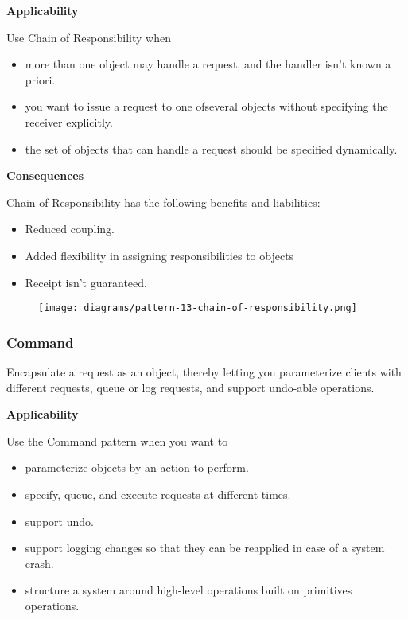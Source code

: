 \documentclass{article}
\begin{document}
\textbf{Applicability}

Use Chain of Responsibility when

\begin{itemize}
    \item more than one object may handle a request, and the handler isn't known a priori.
    \item you want to issue a request to one ofseveral objects without specifying the receiver explicitly.
    \item the set of objects that can handle a request should be specified dynamically.
\end{itemize}

\textbf{Consequences}

Chain of Responsibility has the following benefits and liabilities:
\begin{itemize}
    \item Reduced coupling.
    \item Added flexibility in assigning responsibilities to objects
    \item Receipt isn't guaranteed.
\end{itemize}

\begin{figure}[h]
    \centering
    \texttt{[image: diagrams/pattern-13-chain-of-responsibility.png]}
\end{figure}

\newpage
\subsubsection{Command}
Encapsulate a request as an object, thereby letting you parameterize clients with different requests, queue or log requests, and support undo-able
operations.

\textbf{Applicability}

Use the Command pattern when you want to

\begin{itemize}
    \item parameterize objects by an action to perform.
    \item specify, queue, and execute requests at different times.
    \item support undo.
    \item support logging changes so that they can be reapplied in case of a system crash.
    \item structure a system around high-level operations built on primitives operations.
\end{itemize}
\end{document}
